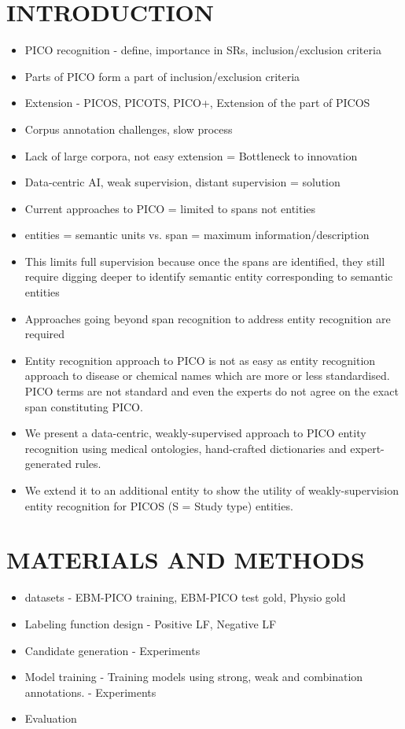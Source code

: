 \documentclass[10.7pt,]{article}
\begin{document}
\section{INTRODUCTION}\label{introduction}
%
\begin{itemize}
    \item PICO recognition - define, importance in SRs, inclusion/exclusion criteria
    \item Parts of PICO form a part of inclusion/exclusion criteria
    \item Extension - PICOS, PICOTS, PICO+, Extension of the part of PICOS
    \item Corpus annotation challenges, slow process
    \item Lack of large corpora, not easy extension = Bottleneck to innovation
    \item Data-centric AI, weak supervision, distant supervision = solution
    \item Current approaches to PICO = limited to spans not entities
    \item entities = semantic units vs. span = maximum information/description
    \item This limits full supervision because once the spans are identified, they still require digging deeper to identify semantic entity corresponding to semantic entities
    \item Approaches going beyond span recognition to address entity recognition are required
    \item Entity recognition approach to PICO is not as easy as entity recognition approach to disease or chemical names which are more or less standardised. PICO terms are not standard and even the experts do not agree on the exact span constituting PICO.
    \item We present a data-centric, weakly-supervised approach to PICO entity recognition using medical ontologies, hand-crafted dictionaries and expert-generated rules. 
    \item We extend it to an additional entity to show the utility of weakly-supervision entity recognition for PICOS (S = Study type) entities.
\end{itemize}
%
%
%
\section{MATERIALS AND METHODS}\label{methods}
%
\begin{itemize}
    \item datasets - EBM-PICO training, EBM-PICO test gold, Physio gold
    \item Labeling function design - Positive LF, Negative LF
    \item Candidate generation - Experiments
    \item Model training - Training models using strong, weak and combination annotations. - Experiments
    \item Evaluation
\end{itemize}
%
%
%
\end{document}
